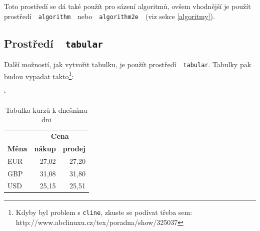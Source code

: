 \documentclass[a4paper, 11pt]{article}
\begin{document}
\noindent Toto prostředí se dá také použít pro sázení algoritmů, ovšem vhodnější je použít prostředí\ \ \texttt{algorithm}\ \ nebo\ \ \texttt{algorithm2e}\ \ (viz sekce \ref{algoritmy}).

\subsection{Prostředí\ \ \texttt{tabular}}

Další možností, jak vytvořit tabulku, je použít prostředí\ \ \texttt{tabular}. Tabulky pak budou vypadat takto\footnote{Kdyby byl problem s \texttt{cline}, zkuste se podívat třeba sem: http://www.abclinuxu.cz/tex/poradna/show/325037}:

\begin{table}[h]
\catcode`
\centering
\begin{tabular}{|l|r|r|}
\hline
\multicolumn{1}{|c|}{\textbf{}} & \multicolumn{2}{c|}{\textbf{Cena}} \\ \cline{2-3} 
\textbf{Měna} & \multicolumn{1}{c|}{\textbf{nákup}} & \multicolumn{1}{c|}{\textbf{prodej}} \\ \hline
EUR & 27,02 & 27,20 \\ \hline
GBP & 31,08 & 31,80 \\ \hline
USD & 25,15 & 25,51 \\ \hline
\end{tabular}
\caption{Tabulka kurzů k dnešnímu dni}
\label{kurzy}
\end{table}
\end{document}
